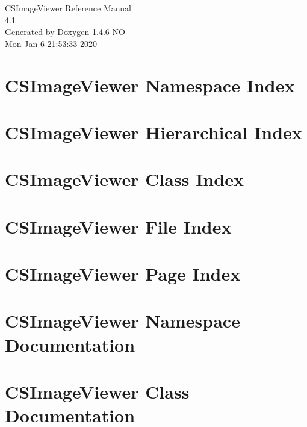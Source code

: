 \documentclass[a4paper]{book}
\begin{document}
\begin{titlepage}
\vspace*{7cm}
\begin{center}
{\Large CSImage\-Viewer Reference Manual\\[1ex]\large 4.1 }\\
\vspace*{1cm}
{\large Generated by Doxygen 1.4.6-NO}\\
\vspace*{0.5cm}
{\small Mon Jan 6 21:53:33 2020}\\
\end{center}
\end{titlepage}
\clearemptydoublepage
{}
\tableofcontents
\clearemptydoublepage
{}
\chapter{CSImage\-Viewer Namespace Index}

\chapter{CSImage\-Viewer Hierarchical Index}

\chapter{CSImage\-Viewer Class Index}

\chapter{CSImage\-Viewer File Index}

\chapter{CSImage\-Viewer Page Index}

\chapter{CSImage\-Viewer Namespace Documentation}










\chapter{CSImage\-Viewer Class Documentation}







\end{document}
